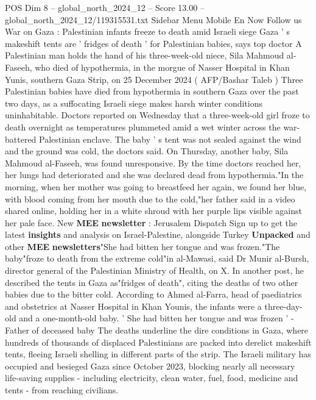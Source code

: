 \begin{textsample}{POS Dim 8 – global\_north\_2024\_12 – Score 13.00 – global\_north\_2024\_12/119315531.txt}  \label{ex:f8_pos_100}
Sidebar Menu Mobile En Now Follow us War on Gaza : Palestinian infants freeze to death amid Israeli siege Gaza ' s makeshift tents are ' fridges of death ' for Palestinian babies, says top doctor A Palestinian man holds the hand of his three-week-old niece, Sila Mahmoud al-Faseeh, who died of hypothermia, in the morgue of Nasser Hospital in Khan Yunis, southern Gaza Strip, on 25 December 2024 ( AFP/Bashar Taleb ) Three Palestinian babies have died from hypothermia in southern Gaza over the past two days, as a suffocating Israeli siege makes harsh winter conditions uninhabitable.
Doctors reported on Wednesday that a three-week-old girl froze to death overnight as temperatures plummeted amid a wet winter across the war-battered Palestinian enclave.
The baby ' s tent was not sealed against the wind and the ground was cold, the doctors said.
On Thursday, another baby, Sila Mahmoud al-Faseeh, was found unresponsive.
By the time doctors reached her, her lungs had deteriorated and she was declared dead from hypothermia."In the morning, when her mother was going to breastfeed her again, we found her blue, with blood coming from her mouth due to the cold,"her father said in a video shared online, holding her in a white shroud with her purple lips visible against her pale face.
New \textbf{MEE} \textbf{newsletter} : Jerusalem Dispatch Sign up to get the latest \textbf{insights} and analysis on Israel-Palestine, alongside Turkey \textbf{Unpacked} and other \textbf{MEE} \textbf{newsletters}"She had bitten her tongue and was frozen."The baby"froze to death from the extreme cold"in al-Mawasi, said Dr Munir al-Bursh, director general of the Palestinian Ministry of Health, on X.
In another post, he described the tents in Gaza as"fridges of death", citing the deaths of two other babies due to the bitter cold.
According to Ahmed al-Farra, head of paediatrics and obstetrics at Nasser Hospital in Khan Younis, the infants were a three-day-old and a one-month-old baby. ' She had bitten her tongue and was frozen ' - Father of deceased baby The deaths underline the dire conditions in Gaza, where hundreds of thousands of displaced Palestinians are packed into derelict makeshift tents, fleeing Israeli shelling in different parts of the strip.
The Israeli military has occupied and besieged Gaza since October 2023, blocking nearly all necessary life-saving supplies - including electricity, clean water, fuel, food, medicine and tents - from reaching civilians.

\end{textsample}
